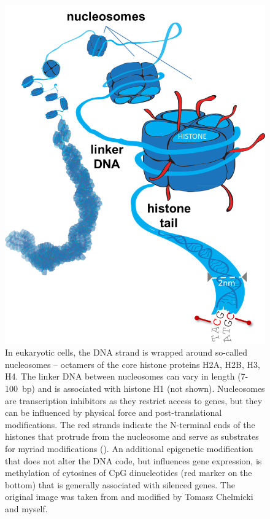 \begin{figure}
 \begin{minipage}[c]{0.55\textwidth}
   \includegraphics[width=\textwidth]{Figures/histones.png}
 \end{minipage}\hfill
 \begin{minipage}[c]{0.4\textwidth}
	\begin{footnotesize}
   \caption[Chromatin, the DNA-protein polymer of eukaryotic cells.]{\textsf{In eukaryotic cells, the DNA strand is wrapped around so-called nucleosomes -- octamers of the core histone proteins H2A, H2B, H3, H4. The linker DNA between nucleosomes can vary in length (7-100~bp) and is associated with histone H1 (not shown). Nucleosomes are transcription inhibitors as they restrict access to genes, but they can be influenced by physical force and post-translational modifications. The red strands indicate the N-terminal ends of the histones that protrude from the nucleosome and serve as substrates for myriad modifications \citep{Kouzarides2007} (). An additional epigenetic modification that does not alter the DNA code, but influences gene expression, is methylation of cytosines of CpG dinucleotides (red marker on the bottom) that is generally associated with silenced genes. The original image was taken from \citep{Histones} and modified by Tomasz Chelmicki and myself.
}}
\label{fig:histone}
\end{footnotesize}
 \end{minipage}
\end{figure}
